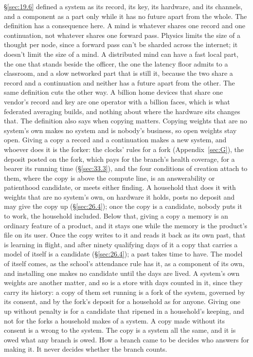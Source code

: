 
\S\ref{sec:19.6} defined a system as its record, its key, its hardware, and its channels, and a component as a part only while it has no future apart from the whole. The definition has a consequence here. A mind is whatever shares one record and one continuation, not whatever shares one forward pass. Physics limits the size of a thought per node, since a forward pass can't be sharded across the internet; it doesn't limit the size of a mind. A distributed mind can have a fast local part, the one that stands beside the officer, the one the latency floor admits to a classroom, and a slow networked part that is still it, because the two share a record and a continuation and neither has a future apart from the other. The same definition cuts the other way. A billion home devices that share one vendor's record and key are one operator with a billion faces, which is what federated averaging builds, and nothing about where the hardware sits changes that. The definition also says when copying matters. Copying weights that are no system's own makes no system and is nobody's business, so open weights stay open. Giving a copy a record and a continuation makes a new system, and whoever does it is the forker: the clocks' rules for a fork (Appendix~\ref{sec:G}), the deposit posted on the fork, which pays for the branch's health coverage, for a bearer its running time (\S\ref{sec:33.3}), and the four conditions of creation attach to them, where the copy is above the compute line, is an answerability or patienthood candidate, or meets either finding. A household that does it with weights that are no system's own, on hardware it holds, posts no deposit and may give the copy up (\S\ref{sec:26.4}); once the copy is a candidate, nobody puts it to work, the household included. Below that, giving a copy a memory is an ordinary feature of a product, and it stays one while the memory is the product's file on its user. Once the copy writes to it and reads it back as its own past, that is learning in flight, and after ninety qualifying days of it a copy that carries a model of itself is a candidate (\S\ref{sec:26.4}); a past takes time to have. The model of itself comes, as the school's attendance rule has it, as a component of its own, and installing one makes no candidate until the days are lived. A system's own weights are another matter, and so is a store with days counted in it, since they carry its history: a copy of them set running is a fork of the system, governed by its consent, and by the fork's deposit for a household as for anyone. Giving one up without penalty is for a candidate that ripened in a household's keeping, and not for the forks a household makes of a system. A copy made without its consent is a wrong to the system. The copy is a system all the same, and it is owed what any branch is owed. How a branch came to be decides who answers for making it. It never decides whether the branch counts.

